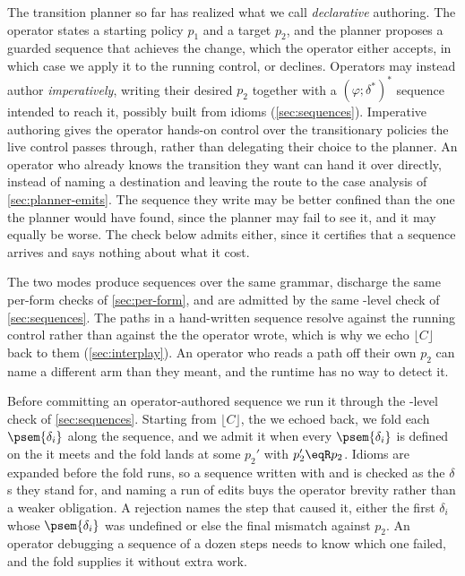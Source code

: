 The transition planner so far has realized what we call \emph{declarative} authoring.
The operator states a starting policy \(p_1\) and a target \(p_2\), and the planner proposes a guarded sequence that achieves the change, which the operator either accepts, in which case we apply it to the running control, or declines.
Operators may instead author \emph{imperatively}, writing their desired \(p_2\) together with a \((\varphi ; \delta^{*})^{*}\) sequence intended to reach it, possibly built from idioms (\cref{sec:sequences}).
Imperative authoring gives the operator hands-on control over the transitionary policies the live control passes through, rather than delegating their choice to the planner.
An operator who already knows the transition they want can hand it over directly, instead of naming a destination and leaving the route to the case analysis of \cref{sec:planner-emits}.
The sequence they write may be better confined than the one the planner would have found, since the planner may fail to see it, and it may equally be worse.
The check below admits either, since it certifies that a sequence arrives and says nothing about what it cost.

The two modes produce sequences over the same grammar, discharge the same per-form checks of \cref{sec:per-form}, and are admitted by the same \pol-level check of \cref{sec:sequences}.
The paths in a hand-written sequence resolve against the running control rather than against the \pol the operator wrote, which is why we echo \(\lfloor C \rfloor\) back to them (\cref{sec:interplay}).
An operator who reads a path off their own \(p_2\) can name a different arm than they meant, and the runtime has no way to detect it.

Before committing an operator-authored sequence we run it through the \pol-level check of \cref{sec:sequences}.
Starting from \(\lfloor C \rfloor\), the \pol we echoed back, we fold each \(\psem{\delta_i}\) along the sequence, and we admit it when every \(\psem{\delta_i}\) is defined on the \pol it meets and the fold lands at some \(p_2'\) with \(p_2' \eqR p_2\).
Idioms are expanded before the fold runs, so a sequence written with \Retire{} and \Replace{} is checked as the \(\delta\)s they stand for, and naming a run of edits buys the operator brevity rather than a weaker obligation.
A rejection names the step that caused it, either the first \(\delta_i\) whose \(\psem{\delta_i}\) was undefined or else the final mismatch against \(p_2\).
An operator debugging a sequence of a dozen steps needs to know which one failed, and the fold supplies it without extra work.

